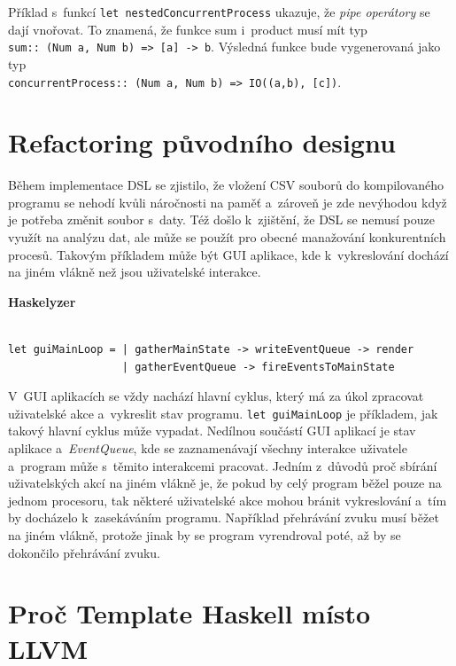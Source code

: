 \documentclass[male, czech]{kithesis}
\newcommand{\haskellInline}[1]{\colorbox{gray!10}{\texttt{#1}}}
\begin{document}
Příklad s~funkcí \haskellInline{let nestedConcurrentProcess} ukazuje, 
že \textit{pipe operátory} se dají vnořovat. 
To znamená, 
že funkce sum i~product musí mít typ \\
\haskellInline{sum:: (Num a, Num b) => [a] -> b}. 
Výsledná funkce bude vygenerovaná jako typ \\
\haskellInline{concurrentProcess:: (Num a, Num b) => IO((a,b), [c])}.

\section{Refactoring původního designu}

Během implementace DSL se zjistilo,
že vložení CSV souborů do kompilovaného programu se nehodí
kvůli náročnosti na paměť
a~zároveň je zde nevýhodou když je potřeba změnit soubor s~daty.
Též došlo k~zjištění,
že DSL se nemusí pouze využít na analýzu dat,
ale může se použít pro obecné manažování konkurentních procesů.
Takovým příkladem může být GUI aplikace,
kde k~vykreslování dochází na jiném vlákně 
než jsou uživatelské interakce.

\textbf{Haskelyzer}
\begin{verbatim}

let guiMainLoop = | gatherMainState -> writeEventQueue -> render
                  | gatherEventQueue -> fireEventsToMainState

\end{verbatim}

V~GUI aplikacích se vždy nachází hlavní cyklus,
který má za úkol zpracovat uživatelské akce
a~vykreslit stav programu.
\haskellInline{let guiMainLoop} je příkladem,
jak takový hlavní cyklus může vypadat.
Nedílnou součástí GUI aplikací je stav aplikace
a~\textit{EventQueue}, kde
se zaznamenávají všechny interakce uživatele
a~program může s~těmito interakcemi pracovat.
Jedním z~důvodů proč sbírání uživatelských akcí na jiném vlákně je,
že pokud by celý program běžel pouze na jednom procesoru,
tak některé uživatelské akce mohou bránit vykreslování
a~tím by docházelo k~zasekáváním programu.
Například přehrávání zvuku musí běžet na jiném vlákně,
protože jinak by se program vyrendroval poté,
až by se dokončilo přehrávání zvuku.

\section{Proč Template Haskell místo LLVM}
\end{document}
